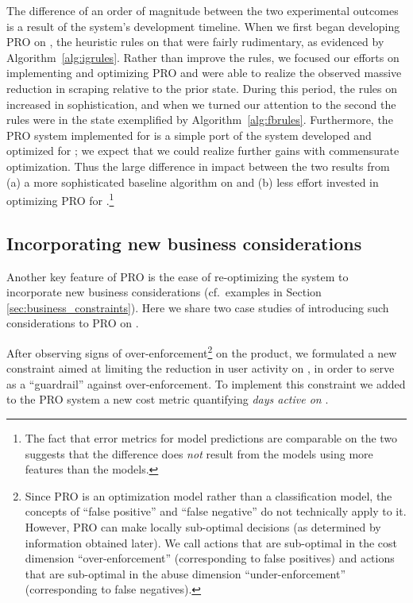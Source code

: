 The difference of an order of magnitude between the two experimental outcomes is a result of the system's development timeline. When we first began developing PRO on \ig, the heuristic rules on that \osn were fairly rudimentary, as evidenced by Algorithm~\ref{alg:igrules}. Rather than improve the rules, we focused our efforts on implementing and optimizing PRO and were able to realize the observed massive reduction in scraping relative to the prior state. During this period, the rules on \fb increased in sophistication, and when we turned our attention to the second \osn the rules were in the state exemplified by Algorithm~\ref{alg:fbrules}. Furthermore, the PRO system implemented for \fb is a simple port of the system developed and optimized for \ig; we expect that we could realize further gains with commensurate optimization. Thus the large difference in impact between the two \osns results from (a) a more sophisticated baseline algorithm on \fb and (b) less effort invested in optimizing PRO for \fb.\footnote{The fact that error metrics for model predictions are comparable on the two \osns suggests that the difference does \emph{not} result from the \ig models using more features than the \fb models.}



\subsection{Incorporating new business considerations}
\label{ss:business}

Another key feature of PRO is the ease of re-optimizing the system to incorporate new business considerations (cf.~examples in Section \ref{sec:business_constraints}). Here we share two case studies of introducing such considerations to PRO on \ig.

After observing signs of over-enforcement\footnote{Since PRO is an optimization model rather than a classification model, the concepts of ``false positive'' and ``false negative'' do not technically apply to it. However, PRO can make locally sub-optimal decisions (as determined by information obtained later). We call actions that are sub-optimal in the cost dimension ``over-enforcement'' (corresponding to false positives) and actions that are sub-optimal in the abuse dimension ``under-enforcement'' (corresponding to false negatives).}
on the \ig \surface product, we formulated a new constraint aimed at limiting the reduction in user activity on \surface, in order to serve as a ``guardrail'' against over-enforcement. To implement this constraint we added to the PRO system a new cost metric quantifying {\em days active on \surface}.

